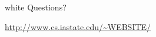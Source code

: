 \begin{frame}
\begin{beamercolorbox}[center]{white}
  {\Large Questions?}

  \vspace{2em}\hfill

  \url{http://www.cs.iastate.edu/~WEBSITE/}
\end{beamercolorbox}
\end{frame}
